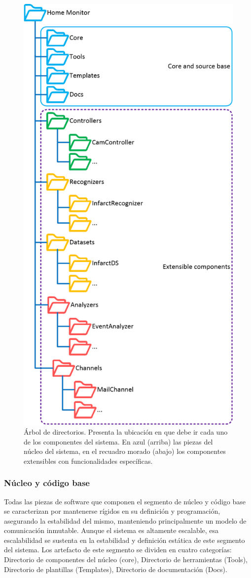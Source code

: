         \begin{figure}[ht!]
        	\centering
        	\includegraphics[width=0.5\linewidth]{imgs/03-Architecture/03-Directories.png}
        	\caption[Árbol de directorios]{Árbol de directorios. Presenta la ubicación en que debe ir cada uno de los componentes del sistema. En azul (arriba) las piezas del núcleo del sistema, en el recuadro morado (abajo) los componentes extensibles con funcionalidades específicas.}
    	    \label{fig:SystemDirectories}
        \end{figure}%
    
        \subsubsection{Núcleo y código base}
        \label{sub2:CoreBaseDirectories}
        
            Todas las piezas de software que componen el segmento de núcleo y código base se caracterizan por mantenerse rígidos en su definición y programación, asegurando la estabilidad del mismo, manteniendo principalmente un modelo de comunicación inmutable. Aunque el sistema es altamente escalable, esa escalabilidad se sustenta en la estabilidad y definición estática de este segmento del sistema. Los artefacto de este segmento se dividen en cuatro categorías: Directorio de componentes del núcleo (core), Directorio de herramientas (Tools), Directorio de plantillas (Templates), Directorio de documentación (Docs).
            
